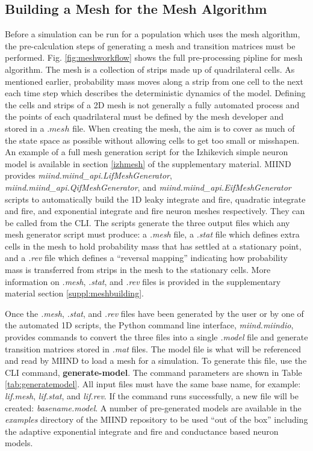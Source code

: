 \documentclass[utf8]{frontiersSCNS} %
\begin{document}
\subsection{Building a Mesh for the Mesh Algorithm}
\label{generatemodelmatfiles}
Before a simulation can be run for a population which uses the mesh algorithm, the pre-calculation steps of generating a mesh and transition matrices must be performed. Fig. \ref{fig:meshworkflow} shows the full pre-processing pipline for mesh algorithm. The mesh is a collection of strips made up of quadrilateral cells. As mentioned earlier, probability mass moves along a strip from one cell to the next each time step which describes the deterministic dynamics of the model. Defining the cells and strips of a 2D mesh is not generally a fully automated process and the points of each quadrilateral must be defined by the mesh developer and stored in a $.mesh$ file. When creating the mesh, the aim is to cover as much of the state space as possible without allowing cells to get too small or misshapen. An example of a full mesh generation script for the Izhikevich simple neuron model \citep{izhikevich2003simple} is available in section \ref{izhmesh} of the supplementary material. MIIND provides \textit{miind.miind\_api.LifMeshGenerator}, \textit{miind.miind\_api.QifMeshGenerator}, and \textit{miind.miind\_api.EifMeshGenerator} scripts to automatically build the 1D leaky integrate and fire, quadratic integrate and fire, and exponential integrate and fire neuron meshes respectively. They can be called from the CLI. The scripts generate the three output files which any mesh generator script must produce: a \textit{.mesh} file, a \textit{.stat} file which defines extra cells in the mesh to hold probability mass that has settled at a stationary point, and a \textit{.rev} file which defines a ``reversal mapping'' indicating how probability mass is transferred from strips in the mesh to the stationary cells. More information on \textit{.mesh}, \textit{.stat}, and \textit{.rev} files is provided in the supplementary material section \ref{suppl:meshbuilding}. 

Once the \textit{.mesh}, \textit{.stat}, and \textit{.rev} files have been generated by the user or by one of the automated 1D scripts, the Python command line interface, \textit{miind.miindio}, provides commands to convert the three files into a single \textit{.model} file and generate transition matrices stored in \textit{.mat} files. The model file is what will be referenced and read by MIIND to load a mesh for a simulation. To generate this file, use the CLI command, \textbf{generate-model}. The command parameters are shown in Table \ref{tab:generatemodel}. All input files must have the same base name, for example: \textit{lif.mesh}, \textit{lif.stat}, and \textit{lif.rev}. If the command runs successfully, a new file will be created: \textit{basename.model}. A number of pre-generated models are available in the \textit{examples} directory of the MIIND repository to be used ``out of the box'' including the adaptive exponential integrate and fire and conductance based neuron models.
\end{document}
